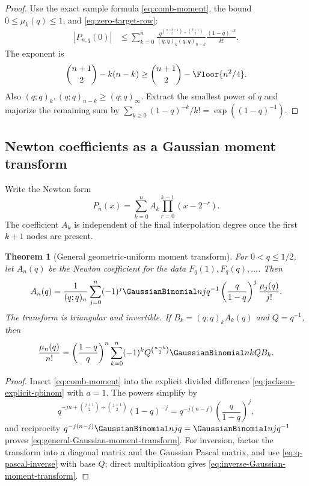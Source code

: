 \documentclass[11pt,a4paper,oneside]{article}
\newtheorem{theorem}{Theorem}[section]
\theoremstyle{definition}
\theoremstyle{remark}
\begin{document}
\begin{proof}
Use the exact sample formula \eqref{eq:comb-moment}, the bound
$0\le\mu_k(q)\le1$, and \eqref{eq:zero-target-row}:
\begin{align*}
 |P_{n,q}(0)|
 &\le\sum_{k=0}^n
 \frac{q^{\binom{n-k+1}{2}+\binom{k+1}{2}}}
 {(q;q)_k(q;q)_{n-k}}
 \frac{(1-q)^{-k}}{k!}.
\end{align*}
The exponent is
\[
 \binom{n+1}{2}-k(n-k)
 \ge\binom{n+1}{2}-\Floor{n^2/4}.
\]
Also $(q;q)_k,(q;q)_{n-k}\ge(q;q)_\infty$.  Extract the smallest power of
$q$ and majorize the remaining sum by
$\sum_{k\ge0}(1-q)^{-k}/k!=\exp((1-q)^{-1})$.
\end{proof}

\subsection{Newton coefficients as a Gaussian moment transform}

Write the Newton form
\begin{equation}
 P_n(x)=\sum_{k=0}^n A_k\prod_{r=0}^{k-1}(x-2^{-r}).
 \label{eq:fabius-newton-form}
\end{equation}
The coefficient $A_k$ is independent of the final interpolation degree once
the first $k+1$ nodes are present.

\begin{theorem}[General geometric-uniform moment transform]
\label{thm:general-moment-transform}
For $0<q\le1/2$, let $A_n(q)$ be the Newton coefficient for the data
$F_q(1),F_q(q),\ldots$.  Then
\begin{equation}
 A_n(q)=\frac1{(q;q)_n}
 \sum_{j=0}^n(-1)^j
 \GaussianBinomial nj{q^{-1}}
 \left(\frac q{1-q}\right)^j
 \frac{\mu_j(q)}{j!}.
 \label{eq:general-Gaussian-moment-transform}
\end{equation}
The transform is triangular and invertible.  If
$B_k=(q;q)_kA_k(q)$ and $Q=q^{-1}$, then
\begin{equation}
 \frac{\mu_n(q)}{n!}
 =\left(\frac{1-q}{q}\right)^n
 \sum_{k=0}^n(-1)^kQ^{\binom{n-k}{2}}
 \GaussianBinomial nkQ B_k.
 \label{eq:inverse-Gaussian-moment-transform}
\end{equation}
\end{theorem}

\begin{proof}
Insert \eqref{eq:comb-moment} into the explicit divided difference
\eqref{eq:jackson-explicit-qbinom} with $a=1$.  The powers simplify by
\[
 q^{-jn+\binom{j+1}{2}+\binom{j+1}{2}}(1-q)^{-j}
 =q^{-j(n-j)}\left(\frac q{1-q}\right)^j,
\]
and reciprocity
$q^{-j(n-j)}\GaussianBinomial njq=\GaussianBinomial nj{q^{-1}}$ proves
\eqref{eq:general-Gaussian-moment-transform}.
For inversion, factor the transform into a diagonal matrix and the Gaussian
Pascal matrix, and use \eqref{eq:q-pascal-inverse} with base $Q$; direct
multiplication gives \eqref{eq:inverse-Gaussian-moment-transform}.
\end{proof}
\end{document}
